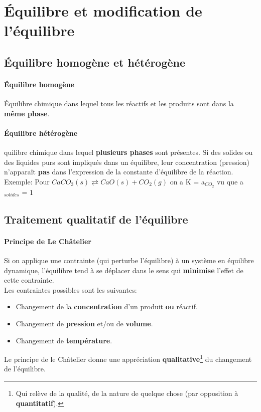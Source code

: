\documentclass[10pt,a4paper]{book}
\begin{document}
\section{Équilibre et modification de l'équilibre}

\subsection{Équilibre homogène et hétérogène}

\paragraph{Équilibre homogène} Équilibre chimique dans lequel tous les réactifs et les produits sont dans la \textbf{même phase}.
\paragraph{Équilibre hétérogène} 	quilibre chimique dans lequel \textbf{plusieurs phases} sont présentes. Si des solides ou des liquides purs sont impliqués dans un équilibre, leur concentration (pression) n’apparaît \textbf{pas} dans l’expression de la constante d’équilibre de la réaction. \\
Exemple: Pour \(CaCO_3(s) \rightleftarrows CaO(s) + CO_2(g)\) on a K = a$_{CO_2}$ vu que a$_{solides}$ = 1

\subsection{Traitement qualitatif de l'équilibre}

\paragraph{Principe de Le Châtelier} Si on applique une contrainte (qui perturbe l’équilibre)
à un système en équilibre dynamique, l’équilibre tend à se déplacer dans le sens qui \textbf{minimise} l’effet de cette contrainte. \\
Les contraintes possibles sont les suivantes:
\begin{itemize}
\item Changement de la \textbf{concentration} d'un produit \textbf{ou} réactif.
\item Changement de \textbf{pression} et/ou de \textbf{volume}.
\item Changement de \textbf{température}.
\end{itemize} \par
Le principe de le Châtelier donne une appréciation \textbf{qualitative}\footnote{Qui relève de la qualité, de la nature de quelque chose (par opposition à \textbf{quantitatif}).} du changement de l'équilibre.
\end{document}
